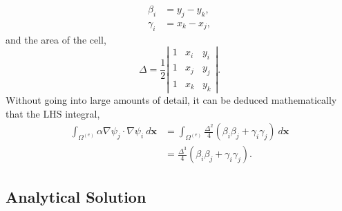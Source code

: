 \begin{align}
	\beta_i &= y_j - y_k,\\
	\gamma_i &= x_k - x_j,
\end{align} 
and the area of the cell,
\begin{equation}
	\Delta = \frac{1}{2}\left\vert
	\begin{matrix}
		1 & x_i & y_i \\
		1 & x_j & y_j \\
		1 & x_k & y_k
	\end{matrix}\right\vert.
\end{equation}
Without going into large amounts of detail, it can be deduced mathematically that the LHS integral,
\begin{align}
	\int_{\Omega^{(e)}} \alpha \nabla \psi_j \cdot \nabla \psi_i~d\mathbf{x} &= \int_{\Omega^{(e)}}\frac{\Delta^2}{4}(\beta_i\beta_j + \gamma_i\gamma_j)~d\mathbf{x}\\
	&= \frac{\Delta^3}{4}(\beta_i\beta_j + \gamma_i\gamma_j).
\end{align}
\subsection{Analytical Solution}

